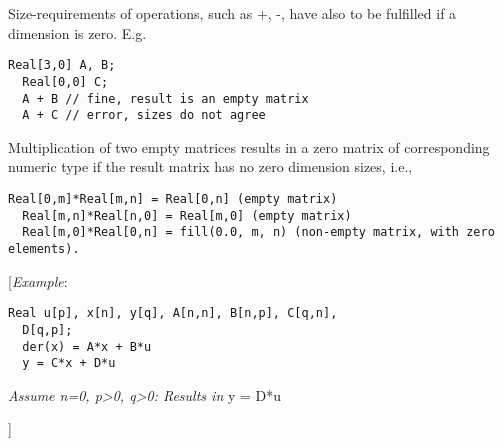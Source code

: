 Size-requirements of operations, such as +, -, have also to be fulfilled
if a dimension is zero. E.g.

\begin{lstlisting}[language=modelica]
  Real[3,0] A, B;
  Real[0,0] C;
  A + B // fine, result is an empty matrix
  A + C // error, sizes do not agree
\end{lstlisting}
Multiplication of two empty matrices results in a zero matrix of
corresponding numeric type if the result matrix has no zero dimension
sizes, i.e.,

\begin{lstlisting}[language=modelica]
  Real[0,m]*Real[m,n] = Real[0,n] (empty matrix)
  Real[m,n]*Real[n,0] = Real[m,0] (empty matrix)
  Real[m,0]*Real[0,n] = fill(0.0, m, n) (non-empty matrix, with zero elements).
\end{lstlisting}
{[}\emph{Example}:

\begin{lstlisting}[language=modelica]
  Real u[p], x[n], y[q], A[n,n], B[n,p], C[q,n],
  D[q,p];
  der(x) = A*x + B*u
  y = C*x + D*u
\end{lstlisting}
\emph{Assume n=0, p\textgreater{}0, q\textgreater{}0: Results in} y =
D*u

{]}
